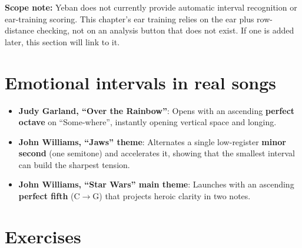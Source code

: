 
\textbf{Scope note:} Yeban does not currently provide automatic interval recognition or ear-training scoring. This chapter's ear training relies on the ear plus row-distance checking, not on an analysis button that does not exist. If one is added later, this section will link to it.

\section{Emotional intervals in real songs}

\begin{itemize}
  \item \textbf{Judy Garland, ``Over the Rainbow''}: Opens with an ascending \textbf{perfect octave} on ``Some-where'', instantly opening vertical space and longing.
  \item \textbf{John Williams, ``Jaws'' theme}: Alternates a single low-register \textbf{minor second} (one semitone) and accelerates it, showing that the smallest interval can build the sharpest tension.
  \item \textbf{John Williams, ``Star Wars'' main theme}: Launches with an ascending \textbf{perfect fifth} (C$\rightarrow$G) that projects heroic clarity in two notes.
\end{itemize}

\section{Exercises}


